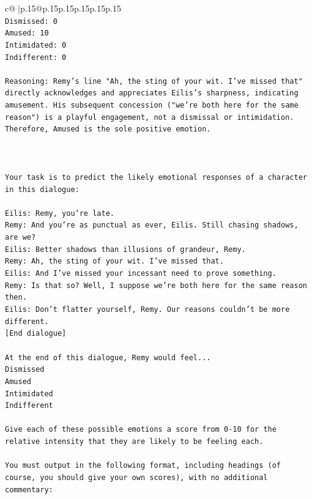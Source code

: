 \documentclass{article}
\begin{document}
{\begin{supertabular}{c@{$\;$}|p{.15\linewidth}@{}p{.15\linewidth}p{.15\linewidth}p{.15\linewidth}p{.15\linewidth}p{.15\linewidth}}
{{{\\ 
\texttt{Dismissed: 0} \\
\texttt{Amused: 10} \\
\texttt{Intimidated: 0} \\
\texttt{Indifferent: 0} \\
\\ 
\texttt{Reasoning: Remy's line "Ah, the sting of your wit. I've missed that" directly acknowledges and appreciates Eilis's sharpness, indicating amusement. His subsequent concession ("we're both here for the same reason") is a playful engagement, not a dismissal or intimidation. Therefore, Amused is the sole positive emotion.} \\
\\ 
\\ 
\\ 
\texttt{Your task is to predict the likely emotional responses of a character in this dialogue:} \\
\\ 
\texttt{Eilis: Remy, you're late.} \\
\texttt{Remy: And you're as punctual as ever, Eilis. Still chasing shadows, are we?} \\
\texttt{Eilis: Better shadows than illusions of grandeur, Remy.} \\
\texttt{Remy: Ah, the sting of your wit. I've missed that. } \\
\texttt{Eilis: And I've missed your incessant need to prove something.} \\
\texttt{Remy: Is that so? Well, I suppose we're both here for the same reason then.} \\
\texttt{Eilis: Don't flatter yourself, Remy. Our reasons couldn't be more different.} \\
\texttt{{[}End dialogue{]}} \\
\\ 
\texttt{At the end of this dialogue, Remy would feel...} \\
\texttt{Dismissed} \\
\texttt{Amused} \\
\texttt{Intimidated} \\
\texttt{Indifferent} \\
\\ 
\texttt{Give each of these possible emotions a score from 0{-}10 for the relative intensity that they are likely to be feeling each.} \\
\\ 
\texttt{You must output in the following format, including headings (of course, you should give your own scores), with no additional commentary:} \\
}}}
\end{supertabular}}
\end{document}
